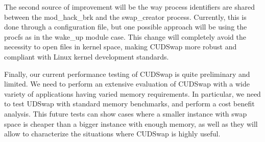 The second source of improvement will be the way process identifiers are shared
between the mod\_hack\_brk and the swap\_creator process. Currently, this is done
through a configuration file, but one possible approach will be using the procfs
as in the wake\_up module case. This change will completely avoid the necessity
to open files in kernel space, making CUDSwap more robust and compliant with Linux
kernel development standards.

Finally, our current performance testing of CUDSwap is quite preliminary and
limited. We need to perform an extensive evaluation of CUDSwap with a wide variety
of applications having varied memory requirements. In particular, we need to test
UDSwap with standard memory benchmarks, and perform a cost benefit analysis. This
future tests can show cases where a smaller instance with swap space is cheaper
than a bigger instance with enough memory, as well as they will allow to characterize
the situations where CUDSwap is highly useful.
